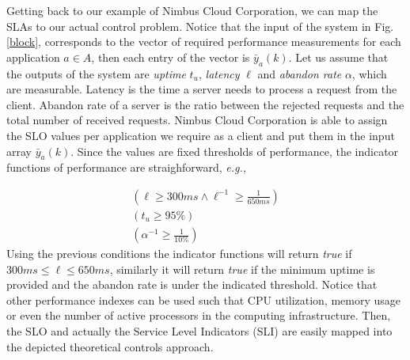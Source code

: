 Getting back to our example of Nimbus Cloud Corporation, we can map the SLAs to our actual control problem. Notice that the input of the system in Fig. \ref{block}, corresponds to
the vector of required performance measurements for each application $a \in A$, then each entry of the vector is $\bar{y}_{a}(k)$. Let us assume that the outputs of the system
are \emph{uptime} $t_{u}$, \emph{latency} $\ell$ and \emph{abandon rate} $\alpha$, which are measurable. Latency is the time a server needs 
to process a request from the client. Abandon rate of a server is the ratio between the rejected requests and the total number of received requests. 
Nimbus Cloud Corporation is able to assign 
the SLO values per application we require as a client and put them in the input array $\bar{y}_{a}(k)$. Since the values are fixed thresholds of performance, the indicator functions of 
performance are straighforward, \emph{e.g.,} 

\begin{eqnarray}
&\left( \ell \geq 300 ms \land \ell^{-1} \geq \frac{1}{650ms} \right)& \nonumber \\
&\left(t_{u} \geq 95\%\right)& \nonumber \\
&\left(\alpha^{-1} \geq \frac{1}{10\%}\right)& \nonumber
\end{eqnarray}
Using the previous conditions the indicator functions will return \emph{true} if $300ms \leq \ell \leq 650ms$, similarly
 it will return \emph{true} if the minimum uptime is provided and the abandon rate is under the indicated threshold. Notice that other performance indexes can be used such that
CPU utilization, memory usage or even the number of active processors in the computing infrastructure. Then, the SLO and 
actually the Service Level Indicators (SLI) are easily mapped into the depicted theoretical controls approach.